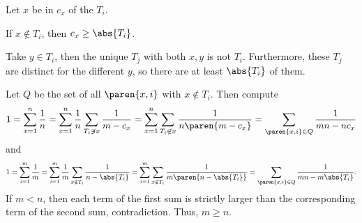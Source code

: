 Let $x$ be in $c_x$ of the $T_i$.

\begin{claim}
If $x\notin T_i$, then $c_x\geq\abs{T_i}$.
\end{claim}

\begin{lemmaproof}
Take $y\in T_i$, then the unique $T_j$ with both $x,y$ is not $T_i$. Furthermore, these $T_j$ are distinct for the different $y$, so there are at least $\abs{T_i}$ of them.
\end{lemmaproof}

Let $Q$ be the set of all $\paren{x,i}$ with $x\notin T_i$. Then compute \[1=\displaystyle\sum_{x=1}^n\frac{1}{n}=\displaystyle\sum_{x=1}^n\frac{1}{n}\displaystyle\sum_{T_i\not\ni x}\frac{1}{m-c_x}=\displaystyle\sum_{x=1}^n\displaystyle\sum_{T_i\not\in x}\frac{1}{n\paren{m-c_x}}=\displaystyle\sum_{\paren{x,i}\in Q}\frac{1}{mn-nc_x}\] and \[1=\displaystyle\sum_{i=1}^m\frac{1}{m}=\displaystyle\sum_{i=1}^m\frac{1}{m}\displaystyle\sum_{x\notin T_i}\frac{1}{n-\abs{T_i}}=\displaystyle\sum_{i=1}^m\displaystyle\sum_{x\notin T_i}\frac{1}{m\paren{n-\abs{T_i}}}=\displaystyle\sum_{\paren{x,i}\in Q}\frac{1}{mn-m\abs{T_i}}.\] If $m<n$, then each term of the first sum is strictly larger than the corresponding term of the second sum, contradiction. Thus, $m\geq n$.